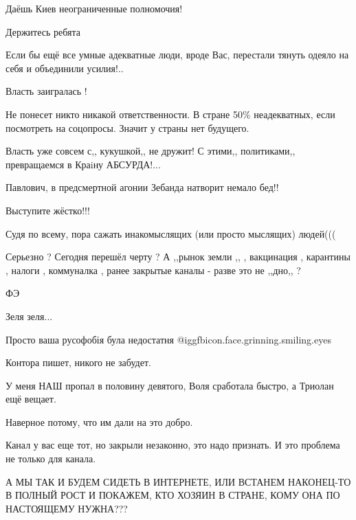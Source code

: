 \begin{itemize}
Даёшь Киев неограниченные полномочия!

Держитесь ребята


Если бы ещё все умные адекватные люди, вроде Вас, перестали тянуть одеяло на
себя и объединили усилия!..

Власть заигралась !


Не понесет никто никакой ответственности. В стране 50\% неадекватных, если
посмотреть на соцопросы. Значит у страны нет будущего.


Власть уже совсем с,, кукушкой,, не дружит! С этими,, политиками,, превращаемся
в Краiну АБСУРДА!...

Павлович, в предсмертной агонии Зебанда натворит немало бед!!

Выступите жёстко!!!

Судя по всему, пора сажать инакомыслящих (или просто мыслящих) людей(((


Серьезно ? Сегодня перешёл черту ? А ,,рынок земли ,, , вакцинация , карантины
, налоги , коммуналка , ранее закрытые каналы - разве это не ,,дно,, ?


ФЭ

Зеля зеля...

Просто ваша русофобія була недостатня  @igg{fbicon.face.grinning.smiling.eyes} 

Контора пишет, никого не забудет.

У меня НАШ пропал в половину девятого, Воля сработала быстро, а Триолан ещё вещает.

Наверное потому, что им дали на это добро.

Канал у вас еще тот, но закрыли незаконно, это надо признать. И это проблема не только для канала.


А МЫ ТАК И БУДЕМ СИДЕТЬ В ИНТЕРНЕТЕ, ИЛИ ВСТАНЕМ НАКОНЕЦ-ТО В ПОЛНЫЙ РОСТ И
ПОКАЖЕМ, КТО ХОЗЯИН В СТРАНЕ, КОМУ ОНА ПО НАСТОЯЩЕМУ НУЖНА???


\end{itemize}
